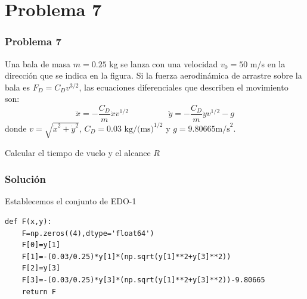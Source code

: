 \section{Problema 7}
\begin{frame}[fragile]
\frametitle{Problema 7}
Una bala de masa $m=0.25$ kg se lanza con una velocidad $v_{0}= 50$ m/s en la dirección que se indica en la figura. Si la fuerza aerodinámica de arrastre sobre la bala es $F_{D}= C_{D} v^{3/2}$, las ecuaciones diferenciales que describen el movimiento son:
\[\ddot{x} = - \dfrac{C_{D}}{m} \dot{x} v^{1/2} \hspace{2cm} \ddot{y}= - \dfrac{C_{D}}{m} \dot{y} v^{1/2} - g\]
donde $v=\sqrt{\dot{x}^{2} + \dot{y}^{2}}$, $C_{D} = 0.03 \mbox{ kg/(ms)}^{1/2}$ y $g=9.80665 \mbox{m/s}^{2}$.
\end{frame}
\begin{frame}[fragile]
Calcular el tiempo de vuelo y el alcance $R$
\begin{center}
\end{center}
\end{frame}
\begin{frame}[fragile]
\frametitle{Solución}
Establecemos el conjunto de EDO-1
\begin{lstlisting}
def F(x,y):
    F=np.zeros((4),dtype='float64')
    F[0]=y[1]
    F[1]=-(0.03/0.25)*y[1]*(np.sqrt(y[1]**2+y[3]**2))
    F[2]=y[3]
    F[3]=-(0.03/0.25)*y[3]*(np.sqrt(y[1]**2+y[3]**2))-9.80665
    return F
\end{lstlisting}
\end{frame}
